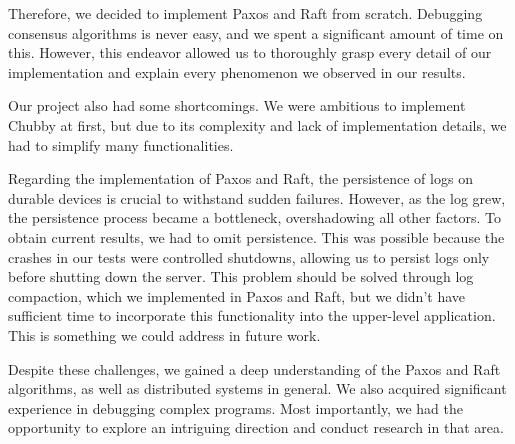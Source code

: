 \documentclass[11pt,a4paper]{article}
\begin{document}
Therefore, we decided to implement Paxos and Raft from scratch. Debugging consensus algorithms is never easy, and we spent a significant amount of time on this. However, this endeavor allowed us to thoroughly grasp every detail of our implementation and explain every phenomenon we observed in our results.

Our project also had some shortcomings. We were ambitious to implement Chubby at first, but due to its complexity and lack of implementation details, we had to simplify many functionalities.

Regarding the implementation of Paxos and Raft, the persistence of logs on durable devices is crucial to withstand sudden failures. However, as the log grew, the persistence process became a bottleneck, overshadowing all other factors. To obtain current results, we had to omit persistence. This was possible because the crashes in our tests were controlled shutdowns, allowing us to persist logs only before shutting down the server. This problem should be solved through log compaction, which we implemented in Paxos and Raft, but we didn't have sufficient time to incorporate this functionality into the upper-level application. This is something we could address in future work.

Despite these challenges, we gained a deep understanding of the Paxos and Raft algorithms, as well as distributed systems in general. We also acquired significant experience in debugging complex programs. Most importantly, we had the opportunity to explore an intriguing direction and conduct research in that area.

\end{document}
